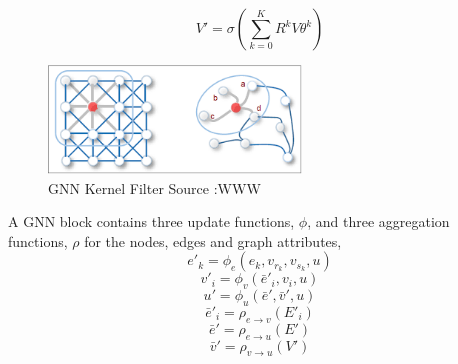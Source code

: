 \documentclass{report} %
\begin{document}
\[ V' = \sigma (\sum_{k=0}^{K}R^{k}V\theta^{k}) \]

\begin{figure}[H]
    \centering
    \includegraphics[width=0.6\textwidth]{./ReportImages/GNNKernel.png} 
    \caption{\ac{GNN} Kernel Filter Source :WWW}
    \label{fig:GNN Kernel Filter}
\end{figure}

A \ac{GNN} block contains three update functions, \( \phi \), and three aggregation functions, \( \rho \) for the nodes, edges and graph attributes, \cite{GNNs-2018}
\[
e'_k = \phi_e(e_k, v_{r_k}, v_{s_k}, u)
\]
\[
v'_i = \phi_v(\bar{e}'_i, v_i, u)
\]
\[
u' = \phi_u(\bar{e}', \bar{v}', u)
\]
\[
\bar{e}'_i = \rho_{e \to v}(E'_i)
\]
\[
\bar{e}' = \rho_{e \to u}(E')
\]
\[
\bar{v}' = \rho_{v \to u}(V')
\]


\listoffigures

\newpage 

\listoftables

\newpage 
\end{document}
